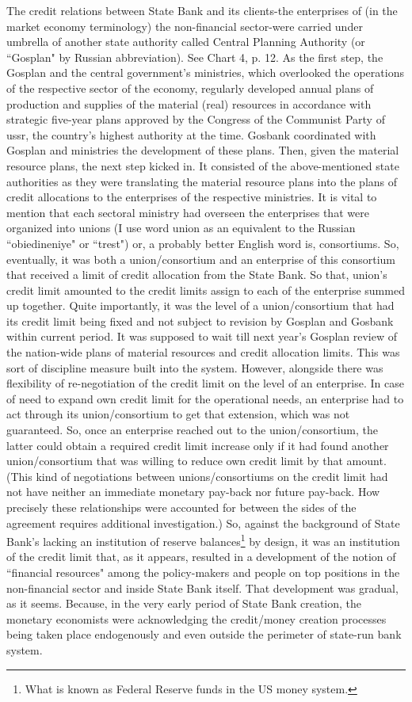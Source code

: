 The credit relations between State Bank and its clients-the enterprises of (in the market economy terminology) the non-financial sector-were carried under umbrella of another state authority called Central Planning Authority (or ``Gosplan" by Russian abbreviation). See Chart 4, p. 12. As the first step, the Gosplan and the central government's ministries, which overlooked the operations of the respective sector of the economy, regularly developed annual plans of production and supplies of the material (real) resources in accordance with strategic five-year plans approved by the Congress of the Communist Party of \ac{ussr}, the country's highest authority at the time. Gosbank coordinated with Gosplan and ministries the development of these plans. Then, given the material resource plans, the next step kicked in. It consisted of the above-mentioned state authorities as they were translating the material resource plans into the plans of credit allocations to the enterprises of the respective ministries. It is vital to mention that each sectoral ministry had overseen the enterprises that were organized into unions (I use word union as an equivalent to the Russian ``obiedineniye" or ``trest") or, a probably better English word is, consortiums. So, eventually, it was both a union/consortium and an enterprise of this consortium that received a limit of credit allocation from the State Bank. So that, union's credit limit amounted to the credit limits assign to each of the enterprise summed up together. Quite importantly, it was the level of a union/consortium that had its credit limit being fixed and not subject to revision by Gosplan and Gosbank within current period. It was supposed to wait till next year's Gosplan review of the nation-wide plans of material resources and credit allocation limits. This was sort of discipline measure built into the system. However, alongside there was flexibility of re-negotiation of the credit limit on the level of an enterprise. In case of need to expand own credit limit for the operational needs, an enterprise had to act through its union/consortium to get that extension, which was not guaranteed. So, once an enterprise reached out to the union/consortium, the latter could obtain a required credit limit increase only if it had found another union/consortium that was willing to reduce own credit limit by that amount. (This kind of negotiations between unions/consortiums on the credit limit had not have neither an immediate monetary pay-back nor future pay-back. How precisely these relationships were accounted for between the sides of the agreement requires additional investigation.) So, against the background of State Bank's lacking an institution of reserve balances\footnote{What is known as Federal Reserve funds in the US money system.} by design, it was an institution of the credit limit that, as it appears, resulted in a development of the notion of ``financial resources" among the policy-makers and people on top positions in the non-financial sector and inside State Bank itself. That development was gradual, as it seems. Because, in the very early period of State Bank creation, the monetary economists were acknowledging the credit/money creation processes being taken place endogenously and even outside the perimeter of state-run bank system. 